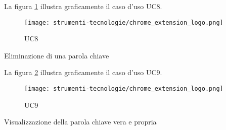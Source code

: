 \vspace{10pt}
\par\noindent
\begin{minipage}{\textwidth}
    La figura \ref{fig:uc8} illustra graficamente il caso d'uso UC8.
    \begin{figure}[H]
        \centering
        \texttt{[image: strumenti-tecnologie/chrome\_extension\_logo.png]} 
        \caption{UC8}
        \label{fig:uc8}
    \end{figure}
\end{minipage}

\begin{usecase}{9}{Eliminazione di una parola chiave}\label{UC9}
\end{usecase}

\vspace{10pt}
\par\noindent
\begin{minipage}{\textwidth}
    La figura \ref{fig:uc9} illustra graficamente il caso d'uso UC9.
    \begin{figure}[H]
        \centering
        \texttt{[image: strumenti-tecnologie/chrome\_extension\_logo.png]} 
        \caption{UC9}
        \label{fig:uc9}
    \end{figure}
\end{minipage}

\begin{usecase}{10}{Visualizzazione della parola chiave vera e propria}\label{UC10}
\end{usecase}

